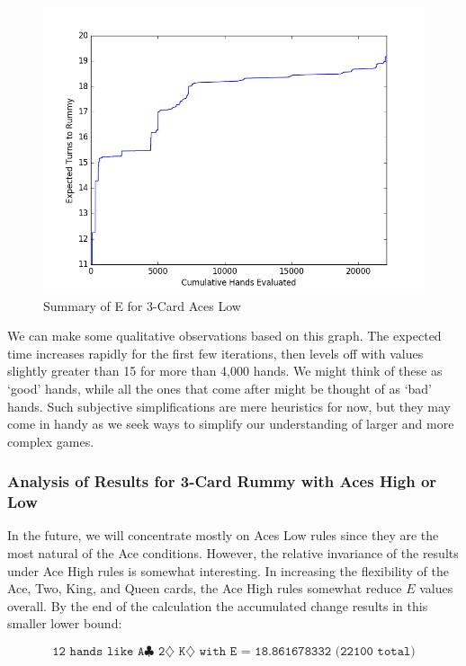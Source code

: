 \documentclass[letter,12pt]{article}
\begin{document}
\begin{figure}
\includegraphics[width=\textwidth]{fig1.png}
\caption{Summary of E for 3-Card Aces Low}\label{fig:1}
\end{figure}

We can make some qualitative observations based on this graph. The expected time increases rapidly for the first few iterations, then levels off with values slightly greater than 15 for more than 4,000 hands. We might think of these as ‘good’ hands, while all the ones that come after might be thought of as ‘bad’ hands. Such subjective simplifications are mere heuristics for now, but they may come in handy as we seek ways to simplify our understanding of larger and more complex games. 

\subsubsection{Analysis of Results for 3-Card Rummy with Aces High or Low}

In the future, we will concentrate mostly on Aces Low rules since they are the most natural of the Ace conditions. However, the relative invariance of the results under Ace High rules is somewhat interesting. In increasing the flexibility of the Ace, Two, King, and Queen cards, the Ace High rules somewhat reduce $E$ values overall. By the end of the calculation the accumulated change results in this smaller lower bound:

$$\texttt{12 hands like A$\clubsuit$ 2$\diamondsuit$ K$\diamondsuit$ with E = 18.861678332 (22100 total)}$$
\end{document}
